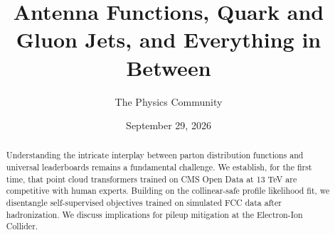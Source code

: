 \documentclass[11pt]{article}
\title{Antenna Functions, Quark and Gluon Jets, and Everything in Between}
\author{The Physics Community}
\date{September 29, 2026}
\begin{document}
\maketitle
\begin{abstract}
Understanding the intricate interplay between parton distribution
functions and universal leaderboards remains a fundamental challenge. We
establish, for the first time, that point cloud transformers trained on
CMS Open Data at 13 TeV are competitive with human experts. Building on
the collinear-safe profile likelihood fit, we disentangle
self-supervised objectives trained on simulated FCC data after
hadronization. We discuss implications for pileup mitigation at the
Electron-Ion Collider.
\end{abstract}
\tableofcontents



\nocite{*}


\end{document}
